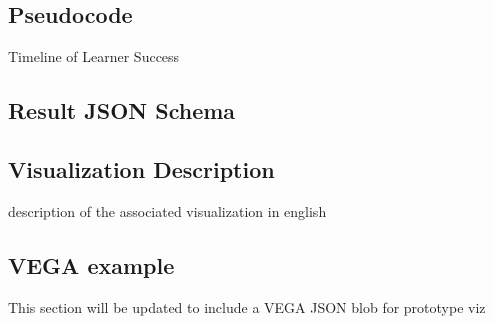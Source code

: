 \documentclass{article}
\begin{document}
  \subsection{Pseudocode}
  \begin{algorithm}[H]
    \SetAlgoLined
    \caption{Timeline of Learner Success}
  \end{algorithm}
  \subsection{Result JSON Schema}
  \subsection{Visualization Description}
  description of the associated visualization in english
  \subsection{VEGA example}
  This section will be updated to include a VEGA JSON blob for prototype viz
\end{document}
